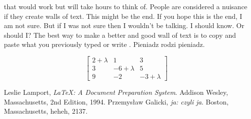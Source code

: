 \documentclass[11pt]{article}
\begin{document}
\begin{center}
that would work but will take hours to think of. People are considered a nuisance if they create walls of text. This might be the end. If you hope this is the end, I am not sure. But if I was not sure then I wouldn't be talking. I should know. Or should I? The best way to make a better and good wall of text is to copy and paste what you previously typed or write
.\cite{Galicki96} Pieniadz rodzi pieniadz.
\end{center}
\newpage
$$\left[\begin{array}{ccc}
2+\lambda&1&3\\
3&-6+\lambda&5\\
9&-2&-3+\lambda
\end{array}\right]$$




\begin{thebibliography}{9}

  Leslie Lamport,
  \emph{\LaTeX: A Document Preparation System}.
  Addison Wesley, Massachusetts,
  2nd Edition,
  1994.
  Przemysław Galicki,
  \emph{ja: czyli ja}.
  Boston, Massachusetts,
  heheh,
  2137.

\end{thebibliography}
\end{document}
